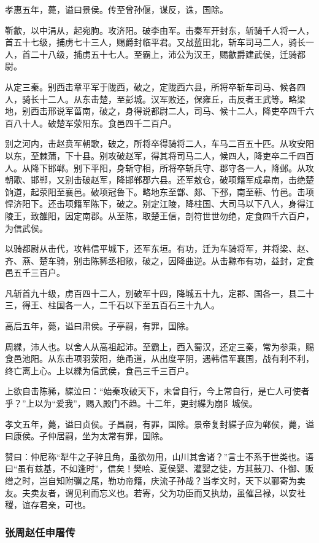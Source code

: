 \documentclass[]{article}
\begin{document}
孝惠五年，薨，谥曰景侯。传至曾孙偃，谋反，诛，国除。

靳歙，以中涓从，起宛朐。攻济阳。破李由军。击秦军开封东，斩骑千人将一人，首五十七级，捕虏七十三人，赐爵封临平君。又战蓝田北，斩车司马二人，骑长一人，首二十八级，捕虏五十七人。至霸上，沛公为汉王，赐歙爵建武侯，迁骑都尉。

从定三秦。别西击章平军于陇西，破之，定陇西六县，所将卒斩车司马、候各四人，骑长十二人。从东击楚，至彭城。汉军败还，保雍丘，击反者王武等。略梁地，别西击邢说军菑南，破之，身得说都尉二人，司马、候十二人，降吏卒四千六百八十人。破楚军荥阳东。食邑四千二百户。

别之河内，击赵贲军朝歌，破之，所将卒得骑将二人，车马二百五十匹。从攻安阳以东，至棘蒲，下十县。别攻破赵军，得其将司马二人，候四人，降吏卒二千四百人。从降下邯郸。别下平阳，身斩守相，所将卒斩兵守、郡守各一人，降邺。从攻朝歌、邯郸，又别击破赵军，降邯郸郡六县。还军敖仓，破项籍军成皋南，击绝楚饷道，起荥阳至襄邑。破项冠鲁下。略地东至鄫、郯、下邳，南至蕲、竹邑。击项悍济阳下。还击项籍军陈下，破之。别定江陵，降柱国、大司马以下八人，身得江陵王，致雒阳，因定南郡。从至陈，取楚王信，剖符世世勿绝，定食四千六百户，为信武侯。

以骑都尉从击代，攻韩信平城下，还军东垣。有功，迁为车骑将军，并将梁、赵、齐、燕、楚车骑，别击陈豨丞相敞，破之，因降曲逆。从击黥布有功，益封，定食邑五千三百户。

凡斩首九十级，虏百四十二人，别破军十四，降城五十九，定郡、国各一，县二十三，得王、柱国各一人，二千石以下至五百石三十九人。

高后五年，薨，谥曰肃侯。子亭嗣，有罪，国除。

周緤，沛人也。以舍人从高祖起沛。至霸上，西入蜀汉，还定三秦，常为参乘，赐食邑池阳。从东击项羽荥阳，绝甬道，从出度平阴，遇韩信军襄国，战有利不利，终亡离上心。上以緤为信武侯，食邑三千三百户。

上欲自击陈豨，緤泣曰：``始秦攻破天下，未曾自行，今上常自行，是亡人可使者乎？''上以为``爱我''，赐入殿门不趋。十二年，更封緤为崩阝城侯。

孝文五年，薨，谥曰贞侯。子昌嗣，有罪，国除。景帝复封緤子应为郸侯，薨，谥曰康侯。子仲居嗣，坐为太常有罪，国除。

赞曰：仲尼称``犁牛之子骍且角，虽欲勿用，山川其舍诸？''言士不系于世类也。语曰``虽有兹基，不如逢时''，信矣！樊哙、夏侯婴、灌婴之徒，方其鼓刀、仆御、贩缯之时，岂自知附骥之尾，勒功帝籍，庆流子孙哉？当孝文时，天下以郦寄为卖友。夫卖友者，谓见利而忘义也。若寄，父为功臣而又执劫，虽催吕禄，以安社稷，谊存君亲，可也。

\hypertarget{header-n3893}{%
\subsubsection{张周赵任申屠传}\label{header-n3893}}
\end{document}
